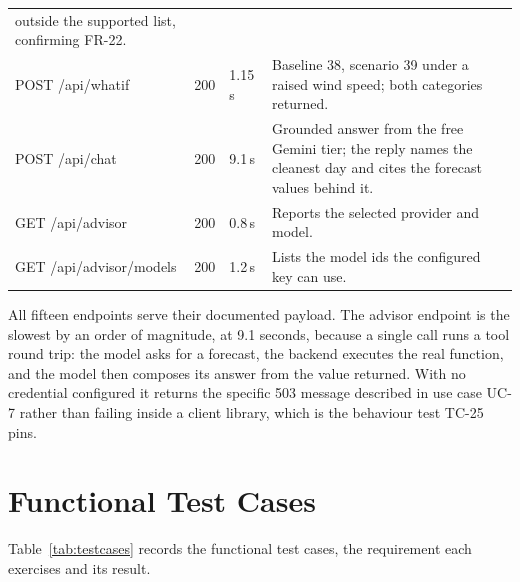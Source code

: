 \begin{xltabular}{\textwidth}{P{5.4cm} Q{1.3cm} Q{1.6cm} Y}
outside the supported list, confirming FR-22. \\
POST /api/whatif & 200 & 1.15\,s & Baseline 38, scenario 39 under a raised wind
speed; both categories returned. \\
POST /api/chat & 200 & 9.1\,s & Grounded answer from the free Gemini tier; the
reply names the cleanest day and cites the forecast values behind it. \\
GET /api/advisor & 200 & 0.8\,s & Reports the selected provider and model. \\
GET /api/advisor/models & 200 & 1.2\,s & Lists the model ids the configured key
can use. \\
\end{xltabular}

All fifteen endpoints serve their documented payload. The advisor endpoint is the
slowest by an order of magnitude, at 9.1 seconds, because a single call runs a
tool round trip: the model asks for a forecast, the backend executes the real
function, and the model then composes its answer from the value returned. With no
credential configured it returns the specific 503 message described in use case
UC-7 rather than failing inside a client library, which is the behaviour test
TC-25 pins.

\section{Functional Test Cases}
Table~\ref{tab:testcases} records the functional test cases, the requirement each
exercises and its result.

